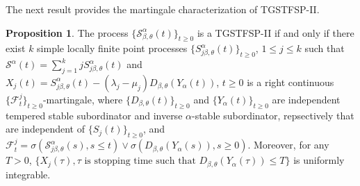 \documentclass[11pt,oneside,reqno]{amsart}
\theoremstyle{definition}
\newtheorem{proposition}{Proposition}[section]
\theoremstyle{remarkstyle}
\begin{document}
The next result provides the martingale characterization of TGSTFSP-II.
\begin{proposition}\label{martingale_characterization_TGSTFSP-II}
The process $\{\mathcal{S}^{\alpha}_{\beta,\theta}(t)\}_{t\ge 0}$ is a TGSTFSP-II if and only if there exist $k$ simple locally finite point processes $\{S^{\alpha}_{j\beta,\theta}(t)\}_{t\ge 0}$, $1\le j\le k$ such that $\mathcal{S}^{\alpha}(t)=\sum_{j=1}^{k}jS^{\alpha}_{j\beta,\theta}(t)$ and $X_j(t)=S^{\alpha}_{j\beta,\theta}(t)-(\lambda_j-\mu_j)D_{\beta,\theta}(Y_{\alpha}(t))$, $t\ge 0$ is a right continuous $\{\mathcal{F}_t^j\}_{t\ge 0}$-martingale, where $\{D_{\beta,\theta}(t)\}_{t\ge 0}$ and $\{Y_{\alpha}(t)\}_{t\ge 0}$ are independent tempered stable subordinator and inverse $\alpha$-stable subordinator, repsectively that are independent of $\{S_j(t)\}_{t\ge 0}$, and $\mathcal{F}_t^j=\sigma(\mathcal{S}^{\alpha}_{j\beta,\theta}(s),s\le t)\vee\sigma(D_{\beta,\theta}(Y_{\alpha}(s)),s\ge 0)$. Moreover, for any $T>0$, $\{X_j(\tau),\tau\,\, \text{is stopping time such that}\,\,D_{\beta,\theta}(Y_\alpha(\tau))\le T\}$ is uniformly integrable.
\end{proposition}
\end{document}
